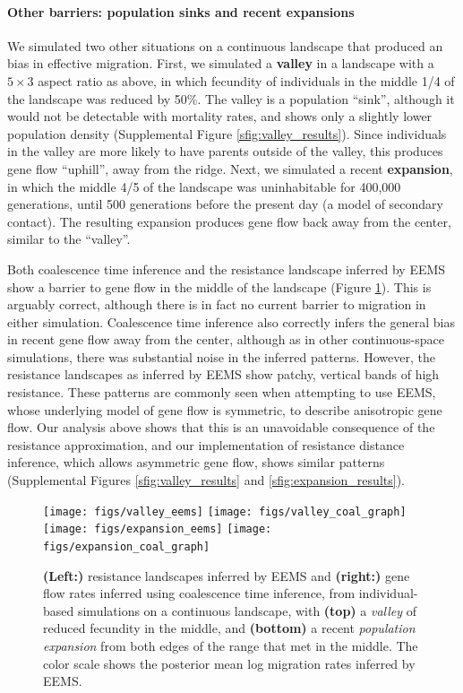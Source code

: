\documentclass{article}
\begin{document}
\paragraph{Other barriers: population sinks and recent expansions}
We simulated two other situations on a continuous landscape that produced an bias in effective migration.
First, we simulated a \textbf{valley} in a landscape with a $5 \times 3$ aspect ratio as above, 
in which fecundity of individuals in the middle 1/4 of the landscape was reduced by 50\%.
The valley is a population ``sink'',
although it would not be detectable with mortality rates,
and shows only a slightly lower population density (Supplemental Figure \ref{sfig:valley_results}).
Since individuals in the valley are more likely to have parents outside of the valley,
this produces gene flow ``uphill'', away from the ridge.
Next, we simulated a recent \textbf{expansion},
in which the middle 4/5 of the landscape was uninhabitable for 400,000 generations,
until 500 generations before the present day
(a model of secondary contact).
The resulting expansion produces gene flow back away from the center,
similar to the ``valley''.

Both coalescence time inference and the resistance landscape inferred by EEMS
show a barrier to gene flow in the middle of the landscape (Figure \ref{fig:more_barriers}).
This is arguably correct, 
although there is in fact no current barrier to migration in either simulation.
Coalescence time inference also correctly infers 
the general bias in recent gene flow away from the center,
although as in other continuous-space simulations, 
there was substantial noise in the inferred patterns.
However, the resistance landscapes as inferred by EEMS show patchy, vertical bands of high resistance.
These patterns are commonly seen when attempting to use EEMS, 
whose underlying model of gene flow is symmetric,
to describe anisotropic gene flow.
Our analysis above shows that this is an unavoidable consequence of the resistance approximation,
and our implementation of resistance distance inference,
which allows asymmetric gene flow, shows similar patterns
(Supplemental Figures \ref{sfig:valley_results} and \ref{sfig:expansion_results}).

\begin{figure}
\centering
    \texttt{[image: figs/valley\_eems]}
    \texttt{[image: figs/valley\_coal\_graph]}
    \texttt{[image: figs/expansion\_eems]}
    \texttt{[image: figs/expansion\_coal\_graph]}
    \caption{
        \textbf{(Left:)}
        resistance landscapes inferred by EEMS
        and 
        \textbf{(right:)}
        gene flow rates inferred using coalescence time inference,
        from individual-based simulations on a continuous landscape,
        with \textbf{(top)} a \emph{valley} of reduced fecundity in the middle, and
        \textbf{(bottom)} a recent \emph{population expansion} from both edges of the range
        that met in the middle.
        The color scale shows the posterior mean log migration rates inferred by EEMS.
        \label{fig:more_barriers}
    }
\end{figure}
\end{document}
